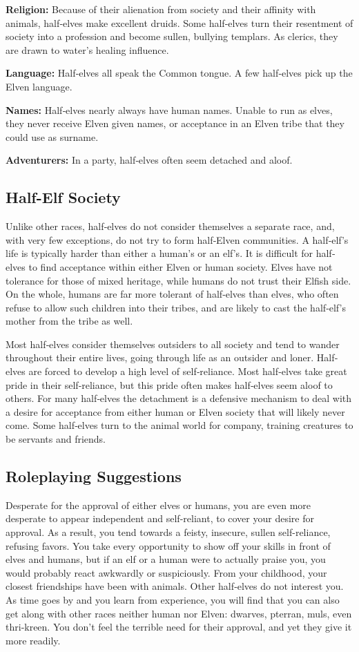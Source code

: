 \textbf{Religion:} Because of their alienation from society and their affinity with animals, half‐elves make excellent druids. Some half‐elves turn their resentment of society into a profession and become sullen, bullying templars. As clerics, they are drawn to water's healing influence.

\textbf{Language:} Half‐elves all speak the Common tongue. A few half‐elves pick up the Elven language.

\textbf{Names:} Half‐elves nearly always have human names. Unable to run as elves, they never receive Elven given names, or acceptance in an Elven tribe that they could use as surname.

\textbf{Adventurers:} In a party, half‐elves often seem detached and aloof.

\subsection{Half-Elf Society}
Unlike other races, half‐elves do not consider themselves a separate race, and, with very few exceptions, do not try to form half‐Elven communities. A half‐elf's life is typically harder than either a human's or an elf's. It is difficult for half‐elves to find acceptance within either Elven or human society. Elves have not tolerance for those of mixed heritage, while humans do not trust their Elfish side. On the whole, humans are far more tolerant of half‐elves than elves, who often refuse to allow such children into their tribes, and are likely to cast the half‐elf's mother from the tribe as well.

Most half‐elves consider themselves outsiders to all society and tend to wander throughout their entire lives, going through life as an outsider and loner. Half‐elves are forced to develop a high level of self‐reliance. Most half‐elves take great pride in their self‐reliance, but this pride often makes half‐elves seem aloof to others. For many half‐elves the detachment is a defensive mechanism to deal with a desire for acceptance from either human or Elven society that will likely never come. Some half‐elves turn to the animal world for company, training creatures to be servants and friends.

\subsection{Roleplaying Suggestions}
Desperate for the approval of either elves or humans, you are even more desperate to appear independent and self-reliant, to cover your desire for approval. As a result, you tend towards a feisty, insecure, sullen self-reliance, refusing favors. You take every opportunity to show off your skills in front of elves and humans, but if an elf or a human were to actually praise you, you would probably react awkwardly or suspiciously. From your childhood, your closest friendships have been with animals. Other half‐elves do not interest you. As time goes by and you learn from experience, you will find that you can also get along with other races neither human nor Elven: dwarves, pterran, muls, even thri‐kreen. You don't feel the terrible need for their approval, and yet they give it more readily.

